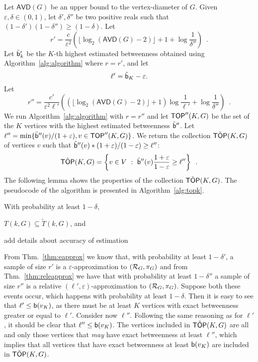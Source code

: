 Let $\mathsf{AVD}(G)$ be an upper bound to the vertex-diameter of $G$. Given
$\varepsilon,\delta\in(0,1)$, let $\delta',\delta''$ be two positive reals such
that $(1-\delta')(1-\delta'')\ge(1-\delta)$. Let
\[
r'=\frac{c}{\varepsilon^2}\left(\lfloor\log_2(\mathsf{AVD}(G)-2)\rfloor+1+\log\frac{1}{\delta''}\right)\enspace.
\]
Let $\tilde{\mathsf{b}}'_k$ be the $K$-th highest estimated betweenness obtained using
Algorithm~\ref{alg:algorithm} where $r=r'$, and let
\[
  \ell'=\tilde{\mathsf{b}}_K-\varepsilon.
\]
Let
\[
r''=\frac{c'}{\varepsilon^2\ell'}\left((\lfloor\log_2(\mathsf{AVD}(G)-2)\rfloor+1)\log\frac{1}{\ell'}+\log\frac{1}{\delta''}\right)\enspace.
\]
We run Algorithm~\ref{alg:algorithm} with $r=r''$ and let $\mathsf{TOP}''(K,G)$ be the set
of the $K$ vertices with the highest estimated betweenness $\tilde{\mathsf{b}}''$. Let
$\ell''=\min\{\tilde{\mathsf{b}}''(v) / (1+\varepsilon), v\in \mathsf{TOP}''(K,G)\}$. We
return the collection $\tilde {\mathsf{TOP}}(K,G)$ of vertices $v$ such that
$\tilde{\mathsf{b}}''(v)*(1+\varepsilon)/(1-\varepsilon)\ge\ell''$:
\[
\tilde{\mathsf{TOP}}(K,G)= \left\{v\in V ~:~
\tilde{\mathsf{b}}''(v)\frac{1+\varepsilon}{1-\varepsilon}\ge\ell''\right\}\enspace.
\]
The following lemma shows the properties of the collection $\tilde{\mathsf{TOP}}(K,G)$.
The pseudocode of the algorithm is presented in Algorithm~\ref{alg:topk}.

\begin{lemma}
  With probability at least $1-\delta$, 
  \begin{enumerate*}
    \item $T(k,G)\subseteq \tilde T(k,G)$, and
    \item \XXX add details about accuracy of estimation
  \end{enumerate*}
\end{lemma}
\begin{IEEEproof}
  From Thm.~\ref{thm:eapprox} we know that, with probability at least
  $1-\delta'$, a sample of size $r'$ is a $\varepsilon$-approximation to
  $(\mathcal{R}_G,\pi_G)$ and from Thm.~\ref{thm:releapprox} we have that with
  probability at least $1-\delta''$ a sample of size $r''$ is a relative
  $(\ell',\varepsilon)$-approximation to $(\mathcal{R}_G,\pi_G)$. Suppose both these
  events occur, which happens with probability at least $1-\delta$. Then it is
  easy to see that $\ell'\le\mathsf{b}(v_K)$, as there must be at least $K$ vertices
  with exact betweenness greater or equal to $\ell'$.  Consider now $\ell''$.
  Following the same reasoning as for $\ell'$, it should be clear that
  $\ell''\le\mathsf{b}(v_K)$. The vertices included in $\tilde{\mathsf{TOP}}(K,G)$ are all and
  only those vertices that \emph{may} have exact betweenness at least $\ell''$,
  which implies that all vertices that have exact betweenness at least
  $\mathsf{b}(v_K)$ are included in $\tilde{\mathsf{TOP}}(K,G)$. 
\end{IEEEproof}

